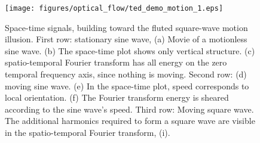 \begin{figure}
\centerline{
\texttt{[image: figures/optical\_flow/ted\_demo\_motion\_1.eps]}
} 
\caption{Space-time signals, building toward the fluted square-wave motion illusion.    First row: stationary sine wave, (a) Movie of a motionless sine wave. (b) The space-time plot shows only vertical structure. 
(c) spatio-temporal Fourier transform has all energy on the zero temporal frequency axis, since nothing is moving.
Second row:  (d) moving sine wave. (e) In the space-time plot, speed corresponds to local orientation. (f) The Fourier transform energy is sheared according to the sine wave's speed.   
Third row:  Moving square wave.  The additional harmonics required to form a square wave are visible in the spatio-temporal Fourier transform, (i).}
\label{fig:motionIllusion1}
\end{figure}



